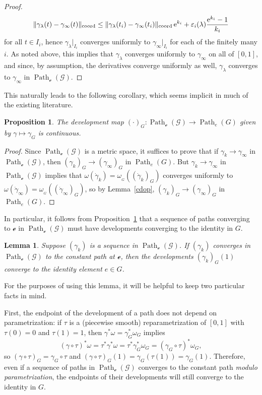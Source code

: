 \documentclass[10pt,a4paper]{amsart}
\numberwithin{equation}{section}
\newtheorem{Lemma}[Theorem]{Lemma}
\newtheorem{Proposition}[Theorem]{Proposition}
\theoremstyle{definition}
\DeclareMathOperator{\Path}{Path}
\newcommand{\MC}[1]{\omega_{{}_{#1}}}
\begin{document}
\begin{proof}
\[\|\gamma_\lambda(t)-\gamma_\infty(t)\|_\text{coord}\leq\|\gamma_\lambda(t_i)-\gamma_\infty(t_i)\|_\text{coord}\,{\rm e}^{k_i}+\varepsilon_i(\lambda)\frac{{\rm e}^{k_i}-1}{k_i}\]
for all $t\in I_i$, hence $\gamma_\lambda|_{I_i}$ converges uniformly to $\gamma_\infty|_{I_i}$ for each of the finitely many $i$. As noted above, this implies that $\gamma_\lambda$ converges uniformly to $\gamma_\infty$ on all of $[0,1]$, and since, by assumption, the derivatives converge uniformly as well, $\gamma_\lambda$ converges to $\gamma_\infty$ in $\Path_\mathscr{e}(\mathscr{G})$.\end{proof}

This naturally leads to the following corollary, which seems implicit in much of the existing literature.

\begin{Proposition}\label{devcont} The development map $(\cdot)_G\colon \Path_\mathscr{e}(\mathscr{G})\to\Path_e(G)$ given by $\gamma\mapsto\gamma_G$ is continuous.\end{Proposition}
\begin{proof}Since $\Path_\mathscr{e}(\mathscr{G})$ is a metric space, it suffices to prove that if $\gamma_k\rightarrow\gamma_\infty$ in $\Path_\mathscr{e}(\mathscr{G})$, then $(\gamma_k)_G\rightarrow(\gamma_\infty)_G$ in $\Path_e(G)$. But $\gamma_k\rightarrow\gamma_\infty$ in $\Path_\mathscr{e}(\mathscr{G})$ implies that $\omega(\dot{\gamma}_k)=\MC{G}((\dot{\gamma}_k)_G)$ converges uniformly to $\omega(\dot{\gamma}_\infty)=\MC{G}((\dot{\gamma}_\infty)_G)$, so by Lemma~\ref{cdop}, $(\gamma_k)_G\rightarrow(\gamma_\infty)_G$ in $\Path_e(G)$. \end{proof}

In particular, it follows from Proposition~\ref{devcont} that a sequence of paths converging to $\mathscr{e}$ in $\Path_\mathscr{e}(\mathscr{G})$ must have developments converging to the identity in $G$.

\begin{Lemma}\label{shrinkingholonomy}Suppose $(\gamma_k)$ is a sequence in $\Path_\mathscr{e}(\mathscr{G})$. If $(\gamma_k)$ converges in $\Path_\mathscr{e}(\mathscr{G})$ to the constant path at $\mathscr{e}$, then the developments $(\gamma_k)_G(1)$ converge to the identity element $e\in G$.\end{Lemma}

For the purposes of using this lemma, it will be helpful to keep two particular facts in mind.

First, the endpoint of the development of a path does not depend on parametrization: if $\tau$ is a (piecewise smooth) reparametrization of $[0,1]$ with $\tau(0)=0$ and $\tau(1)=1$, then $\gamma^*\omega=\gamma_G^*\omega_G$ implies \[(\gamma\circ\tau)^*\omega=\tau^*\gamma^*\omega=\tau^*\gamma_G^*\omega_G=(\gamma_G\circ\tau)^*\omega_G,\] so $(\gamma\circ\tau)_G=\gamma_G\circ\tau$ and $(\gamma\circ\tau)_G(1)=\gamma_G(\tau(1))=\gamma_G(1)$. Therefore, even if a sequence of paths in $\Path_\mathscr{e}(\mathscr{G})$ converges to the constant path \textit{modulo parametrization}, the endpoints of their developments will still converge to the identity in $G$.
\end{document}
